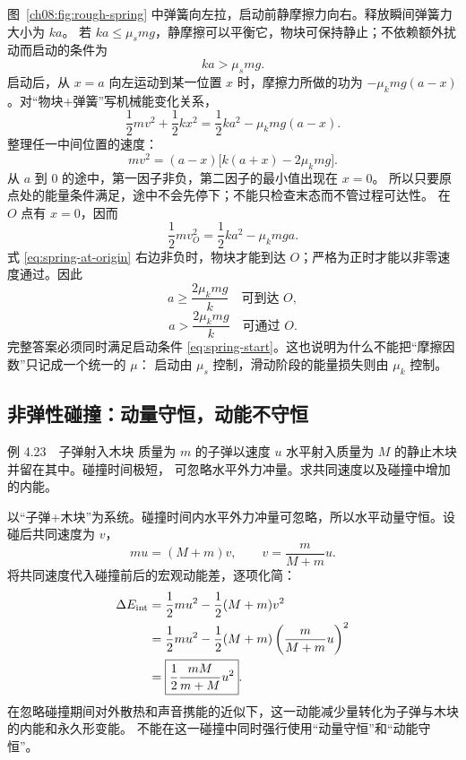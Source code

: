 \begin{xesolution}
图~\ref{ch08:fig:rough-spring} 中弹簧向左拉，启动前静摩擦力向右。释放瞬间弹簧力大小为 $ka$。
若 $ka\le\mu_smg$，静摩擦可以平衡它，物块可保持静止；不依赖额外扰动而启动的条件为
\begin{equation}
  \boxed{ka>\mu_smg}.
  \label{eq:spring-start}
\end{equation}
启动后，从 $x=a$ 向左运动到某一位置 $x$ 时，摩擦力所做的功为 $-\mu_kmg(a-x)$。对“物块+弹簧”写机械能变化关系，
\[
  \frac12mv^2+\frac12kx^2
  =\frac12ka^2-\mu_kmg(a-x).
\]
整理任一中间位置的速度：
\[
 mv^2=(a-x)\bigl[k(a+x)-2\mu_kmg\bigr].
\]
从 $a$ 到 $0$ 的途中，第一因子非负，第二因子的最小值出现在 $x=0$。
所以只要原点处的能量条件满足，途中不会先停下；不能只检查末态而不管过程可达性。
在 $O$ 点有 $x=0$，因而
\begin{equation}
  \frac12mv_O^2=\frac12ka^2-\mu_kmga.
  \label{eq:spring-at-origin}
\end{equation}
式 \eqref{eq:spring-at-origin} 右边非负时，物块才能到达 $O$；严格为正时才能以非零速度通过。因此
\[
  \boxed{a\ge\frac{2\mu_kmg}{k}\quad\text{可到达 }O},
\]
\[
  \boxed{a>\frac{2\mu_kmg}{k}\quad\text{可通过 }O}.
\]
完整答案必须同时满足启动条件 \eqref{eq:spring-start}。这也说明为什么不能把“摩擦因数”只记成一个统一的 $\mu$：
启动由 $\mu_s$ 控制，滑动阶段的能量损失则由 $\mu_k$ 控制。
\end{xesolution}

\subsection{非弹性碰撞：动量守恒，动能不守恒}

\begin{origexamplebox}{例 4.23　子弹射入木块}
质量为 $m$ 的子弹以速度 $u$ 水平射入质量为 $M$ 的静止木块并留在其中。碰撞时间极短，
可忽略水平外力冲量。求共同速度以及碰撞中增加的内能。
\end{origexamplebox}

\begin{xesolution}
以“子弹+木块”为系统。碰撞时间内水平外力冲量可忽略，所以水平动量守恒。设碰后共同速度为 $v$，
\[
  m u=(M+m)v,\qquad \boxed{v=\frac{m}{M+m}u}.
\]
将共同速度代入碰撞前后的宏观动能差，逐项化简：
\begin{align*}
  \Delta E_{\rm int}
  &=\frac12mu^2-\frac12(M+m)v^2\\
  &=\frac12mu^2-\frac12(M+m)
    \left(\frac{m}{M+m}u\right)^2\\
  &=\boxed{\frac12\frac{mM}{m+M}u^2}.
\end{align*}
在忽略碰撞期间对外散热和声音携能的近似下，这一动能减少量转化为子弹与木块的内能和永久形变能。
不能在这一碰撞中同时强行使用“动量守恒”和“动能守恒”。
\end{xesolution}

